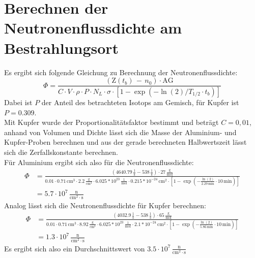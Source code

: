 \documentclass[12pt,german]{article}
\begin{document}
    \section{Berechnen der Neutronenflussdichte am Bestrahlungsort}
    Es ergibt sich folgende Gleichung zu Berechnung der Neutronenflussdichte:
    \begin{equation*}
        \Phi = \frac{\left(\text{Z}(t_b)\, -\, n_0\right) \cdot \text{AG}}{C \cdot V \cdot \rho \cdot P \cdot N_L \cdot \sigma \cdot \left[1 - \exp(-\ln(2)/T_{1/2} \cdot t_b)\right]}
    \end{equation*}
    Dabei ist $P$ der Anteil des betrachteten Isotops am Gemisch, für Kupfer ist $P = 0.309$. \\
    Mit Kupfer wurde der Proportionalitätsfaktor bestimmt und beträgt $C = 0,01$, anhand von Volumen und Dichte lässt sich die Masse der Aluminium- und Kupfer-Proben berechnen und aus der gerade berechneten Halbwertszeit lässt sich die Zerfallskonstante berechnen. \\
    Für Aluminium ergibt sich also für die Neutronenflussdichte:
    \begin{align*}
        \Phi &= \frac{\left(4640.79\, \frac{1}{\text{s}} - 538\, \frac{1}{\text{s}}\right) \cdot 27\, \frac{\text{g}}{\text{mol}}}{0.01 \cdot 0.71\, \text{cm}^3 \cdot 2.2\, \frac{\text{g}}{\text{cm}^3} \cdot 6.025 * 10^{23}\, \frac{1}{\text{mol}} \cdot 0.215 * 10^{-24}\, \text{cm}^2 \cdot \left[1 - \exp\left(- \frac{\ln(2)}{2.29\, \text{min}} \cdot 10\, \text{min}\right)\right]} \\
             &= 5.7 \cdot 10^7\, \frac{\text{n}}{\text{cm}^2 \cdot \text{s}}
    \end{align*}
    Analog lässt sich die Neutronenflussdichte für Kupfer berechnen:
    \begin{align*}
        \Phi &= \frac{\left(4032.9\, \frac{1}{\text{s}} - 538\, \frac{1}{\text{s}}\right) \cdot 65\, \frac{\text{g}}{\text{mol}}}{0.01 \cdot 0.71\, \text{cm}^3 \cdot 8.92\, \frac{\text{g}}{\text{cm}^3} \cdot 6.025 * 10^{23}\, \frac{1}{\text{mol}} \cdot 2.1 * 10^{-24}\, \text{cm}^2 \cdot \left[1 - \exp\left(- \frac{\ln(2)}{5.86\, \text{min}} \cdot 10\, \text{min}\right)\right]} \\
             &= 1.3 \cdot 10^7\, \frac{\text{n}}{\text{cm}^2 \cdot \text{s}}
    \end{align*}
    Es ergibt sich also ein Durchschnittswert von $3.5 \cdot 10^7\, \frac{\text{n}}{\text{cm}^2 \cdot \text{s}}$
\end{document}
